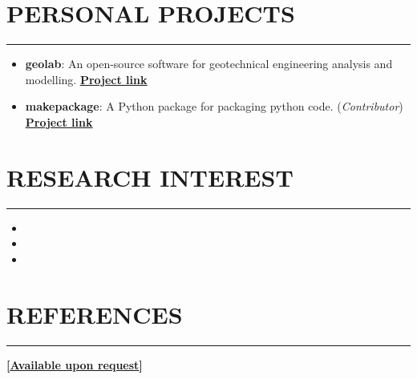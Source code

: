\documentclass[letterpaper, 12pt]{article}
\newcommand{\cvsection}[1]{
	
	\section*{#1}	
	\rule[20pt]{\linewidth}{0.5pt} %

}
\newcommand{\itemizeMargin}{11pt}
\begin{document}
	
	\cvsection{PERSONAL PROJECTS}
	
	\begin{itemize}[leftmargin=\itemizeMargin, before=\vspace{-\baselineskip}]
		
		\item \textbf{geolab}: An open-source software for geotechnical engineering analysis and modelling. \href{https://www.github.com/patrickboateng/geolab}{\underline{\textbf{Project link}}}
		
		\item \textbf{makepackage}: A Python package for packaging python code. (\textit{Contributor})
		\href{https://github.com/nyggus/makepackage}{\underline{\textbf{Project link}}}
		
	\end{itemize}
	
	
	\cvsection{RESEARCH INTEREST}
	
	\begin{itemize}[leftmargin=\itemizeMargin, before=\vspace{-\baselineskip}]
		
		\item 
		\item 
		\item 
		
	\end{itemize}
	
	
	\cvsection{REFERENCES}
	
	\textbf{[\href{mailto:boatengpatrick456@gmail.com}{\underline{Available upon request}}]}
	
\end{document}
